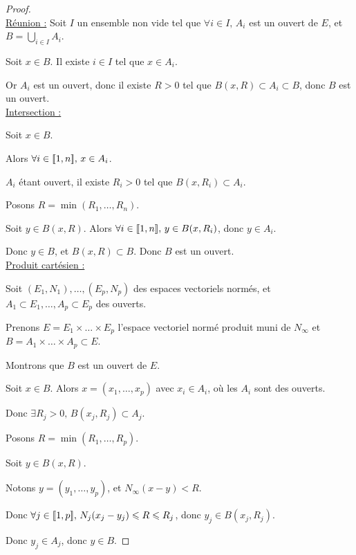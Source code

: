 \begin{proof}~\\
    \uline{Réunion :}
    \svspace Soit $I$ un ensemble non vide tel que $\forall i \in I, \, A_i$ est un ouvert de $E$, et 
    $\displaystyle B = \bigcup_{i \in I} A_i$.

    Soit $x \in B$. Il existe $i \in I$ tel que $x \in A_i$.

    Or $A_i$ est un ouvert, donc il existe $R > 0$ tel que $B(x, R) \subset A_i \subset B$, 
    donc $B$ est un ouvert. \\

    \uline{Intersection :}

    \svspace Soit $x \in B$. 

    Alors $\forall i \in [\![1, n]\!], \, x \in A_i$. 

    $A_i$ étant ouvert, il existe $R_i > 0$ tel que $B(x, R_i) \subset A_i$.

    Posons $R = \min(R_1, \dots, R_n)$.

    Soit $y \in B(x, R)$. Alors $\forall i \in [\![1, n]\!], \, y \in B(x, R_i)$, donc $y \in A_i$.

    Donc $y \in B$, et $B(x, R) \subset B$. Donc $B$ est un ouvert. \\

    \uline{Produit cartésien :}

    \svspace Soit $(E_1, N_1), \dots, (E_p, N_p)$ des espaces vectoriels normés, et 
    $A_1 \subset E_1, \dots, A_p \subset E_p$ des ouverts.

    Prenons $E = E_1 \times \dots \times E_p$ l'espace vectoriel normé produit muni de $N_\infty$
    et $B = A_1 \times \dots \times A_p \subset E$.

    Montrons que $B$ est un ouvert de $E$.

    Soit $x \in B$. Alors $x = (x_1, \dots, x_p)$ avec $x_i \in A_i$, où les $A_i$ sont des ouverts.

    Donc $\exists R_j > 0, \, B(x_j, R_j) \subset A_j$.

    Posons $R = \min(R_1, \dots, R_p)$.

    Soit $y \in B(x, R)$. 

    Notons $y = (y_1, \dots, y_p)$, et $N_\infty(x - y) < R$.

    Donc $\forall j \in [\![1, p]\!], \, N_j(x_j - y_j) \leqslant R \leqslant R_j$, donc $y_j \in B(x_j, R_j)$.

    Donc $y_j \in A_j$, donc $y \in B$.
\end{proof}

